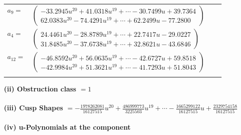 \documentclass[1p]{elsarticle_modified}
\theoremstyle{definition}
\begin{document}
\begin{tabular}{m{7pt} m{180pt} m{7pt} m{180pt} }
\flushright $a_{9}=$&$\begin{pmatrix}-33.2945 u^{20}+41.0318 u^{19}+\cdots-30.7499 u+39.7364\\62.0383 u^{20}-74.4291 u^{19}+\cdots+62.2499 u-77.2800\end{pmatrix}$ \\
\flushright $a_{4}=$&$\begin{pmatrix}24.4461 u^{20}-28.8789 u^{19}+\cdots+22.7417 u-29.0227\\31.8485 u^{20}-37.6738 u^{19}+\cdots+32.8621 u-43.6846\end{pmatrix}$ \\
\flushright $a_{12}=$&$\begin{pmatrix}-46.8592 u^{20}+56.0635 u^{19}+\cdots-42.6727 u+59.8518\\-42.9984 u^{20}+51.3621 u^{19}+\cdots-41.7293 u+51.8043\end{pmatrix}$\\&\end{tabular}
\flushleft \textbf{(ii) Obstruction class $= 1$}\\~\\
\flushleft \textbf{(iii) Cusp Shapes $= -\frac{1978262081}{16127515} u^{20}+\frac{486999773}{3225503} u^{19}+\cdots-\frac{1665299122}{16127515} u+\frac{2329754158}{16127515}$}\\~\\
\newpage\renewcommand{\arraystretch}{1}
\flushleft \textbf{(iv) u-Polynomials at the component}\newline \\
\end{document}
